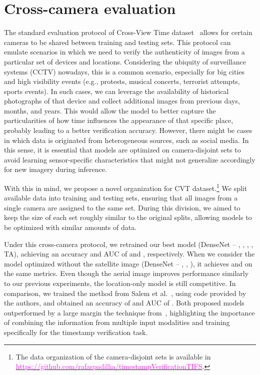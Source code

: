 \documentclass[journal]{IEEEtran}
\newcommand{\repoLink}[1]{\textcolor{magenta}{#1}}
\begin{document}
        
        
    

\section{Cross-camera evaluation}\label{sec:cross_camera}
    The standard evaluation protocol of Cross-View Time dataset~\cite{salem2020learning} allows for certain cameras to be shared between training and testing sets. This protocol can emulate scenarios in which we need to verify the authenticity of images from a particular set of devices and locations. Considering the ubiquity of surveillance systems (CCTV) nowadays, this is a common scenario, especially for big cities and high visibility events (e.g., protests, musical concerts, terrorist attempts, sports events). In such cases, we can leverage the availability of historical photographs of that device and collect additional images from previous days, months, and years. This would allow the model to better capture the particularities of how time influences the appearance of that specific place, probably leading to a better verification accuracy. However, there might be cases in which data is originated from heterogeneous sources, such as social media. In this sense, it is essential that models are optimized on camera-disjoint sets to avoid learning sensor-specific characteristics that might not generalize accordingly for new imagery during inference.
    
    With this in mind, we propose a novel organization for CVT dataset.\footnote{The data organization of the camera-disjoint sets is available in \href{https://github.com/rafaspadilha/timestampVerificationTIFS}{\repoLink{https://github.com/rafaspadilha/timestampVerificationTIFS}}.} We split available data into training and testing sets, ensuring that all images from a single camera are assigned to the same set. During this division, we aimed to keep the size of each set roughly similar to the original splits, allowing models to be optimized with similar amounts of data. 
    
    Under this cross-camera protocol, we retrained our best model (DenseNet -- , , , , TA), achieving an accuracy and AUC of  and , respectively. When we consider the model optimized without the satellite image (DenseNet -- , , ), it achieves  and  on the same metrics. Even though the aerial image improves performance similarly to our previous experiments, the location-only model is still competitive. In comparison, we trained the method from Salem et al.~\cite{salem2020learning}, using code provided by the authors, and obtained an accuracy of  and AUC of . Both proposed models outperformed by a large margin the technique from~\cite{salem2020learning}, highlighting the importance of combining the information from multiple input modalities and training specifically for the timestamp verification task. 
    
\end{document}
